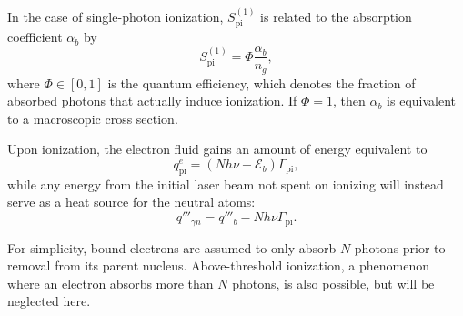 In the case of single-photon ionization, $S_{\text{pi}}^{(1)}$ is related to the absorption coefficient $\alpha_b$ by
\begin{equation}
    S_{\text{pi}}^{(1)} = \Phi \frac{\alpha_b}{n_g},
    \label{eqn:S_pi1}
\end{equation}
where $\Phi \in [0, 1]$ is the quantum efficiency, which denotes the fraction of absorbed photons that actually induce ionization. If $\Phi = 1$, then $\alpha_b$ is equivalent to a macroscopic cross section.

Upon ionization, the electron fluid gains an amount of energy equivalent to
\begin{equation}
    q^e_{\text{pi}} = (Nh\nu - \mathcal{E}_b) \Gamma_{\text{pi}}
    \label{eqn:electron_energy_N},
\end{equation}
while any energy from the initial laser beam not spent on ionizing will instead serve as a heat source for the neutral atoms:
\begin{equation}
    q'''_{\gamma n} = q'''_b - Nh\nu \Gamma_{\text{pi}}
    \label{eqn:excitation_energy}.
\end{equation}

For simplicity, bound electrons are assumed to only absorb $N$ photons prior to removal from its parent nucleus. Above-threshold ionization, a phenomenon where an electron absorbs more than $N$ photons, is also possible,
but will be neglected here.